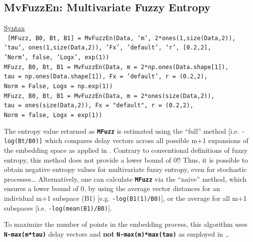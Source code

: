 \documentclass[12pt, a4paper, titlepage, openany]{book}
\begin{document}
\subsection{\normalsize MvFuzzEn: \hspace{15mm} Multivariate Fuzzy Entropy} \label{MvFuzzEn}
\noindent\ul{Syntax} \vspace{6mm} \\ \noindent \texttt{\footnotesize
[MFuzz, B0, Bt, B1] = MvFuzzEn(Data, ‘m’, 2*ones(1,size(Data,2)), \\ \indent ‘tau’, ones(1,size(Data,2)), 'Fx', 'default', ‘r’, [0.2,2], \\ \indent 'Norm', false, ‘Logx’, exp(1))\\
 MFuzz, B0, Bt, B1  = MvFuzzEn(Data, m = 2*np.ones(Data.shape[1]), \\ \indent tau = np.ones(Data.shape[1]), Fx = 'default', r = (0.2,2), \\ \indent Norm = False, Logx = np.exp(1))\\
 MFuzz, B0, Bt, B1  = MvFuzzEn(Data, m = 2*ones(size(Data,2)), \\ \indent tau = ones(size(Data,2)), Fx = "default", r = (0.2,2), \\ \indent Norm = false, Logx = exp(1))}
 
\begin{tcolorbox}[colback=ehone!5, colframe=ehone!, title=\hypertarget{bidinote}{\textbf{IMPORTANT}}, label={BiBox}]
The entropy value returned as \texttt{\textbf{MFuzz}} is estimated using the “full” method [i.e. \texttt{-log(Bt/B0)]} which compares delay vectors across all possible m+1 expansions of the embedding space as applied in \cite{MvSamp1}. Contrary to conventional definitions of fuzzy entropy, this method does not provide a lower bound of 0!! Thus, it is possible to obtain negative entropy values for multivariate fuzzy entropy, even for stochastic processes…
\newline
Alternatively, one can calculate \texttt{\textbf{MFuzz}} via the “naive” method, which ensures a lower bound of 0, by using the average vector distances for an individual m+1 subspace (B1) [e.g. \texttt{-log(B1(1)/B0)}], or the average for all m+1 subspaces [i.e. \texttt{-log(mean(B1)/B0)}].
\end{tcolorbox} 

\begin{tcolorbox}[colback=ehone!5, colframe=ehtwo!, title=\hypertarget{bidinote}{\textbf{NOTE}}, label={BiBox}]
To maximize the number of points in the embedding process, this algorithm uses \texttt{\textbf{N-max(m*tau)}} delay vectors and \textbf{not} \texttt{\textbf{N-max(m)*max(tau)}} as employed in \cite{MvSamp2},\cite{MvSamp1}.
\end{tcolorbox} 
 
\end{document}
